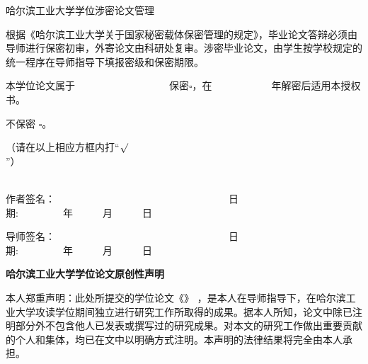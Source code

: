 {} %

\begin{center}{\subchapterstyle 哈尔滨工业大学\cxuewei 学位涉密论文管理}\end{center}

    根据《哈尔滨工业大学关于国家秘密载体保密管理的规定》，毕业论文答辩必须由导师进行保密初审，外寄论文由科研处复审。涉密毕业论文，由学生按学校规定的统一程序在导师指导下填报密级和保密期限。

\begin{flushright}

本学位论文属于~~~~~~~~~~~~~~~~~~~保密$\square$，在~~~~~~~~~~~~年解密后适用本授权书。~~~~~

不保密
$\square$。~~~~~~~~~~~~~~~~~~~~~~~~~~~~~~~~~~~~~~~~~~~~~~~~~~~~~~~~~~~~~~

（请在以上相应方框内打“$\surd$”）~~~~~~~~~~~~~~~~~~~~~~~~~~~~~~~~~~~~~~~~~~~~~~~~~~~~~~~~~~~~~~~~~~~~~~~

\end{flushright}
\begin{flushright}

作者签名：~~~~~~~~~~~~~~~~~~~~~~~~~~~~~~~~~~~日期:~~~~~~~~~年~~~~~~月~~~~~~日~~~~

导师签名：~~~~~~~~~~~~~~~~~~~~~~~~~~~~~~~~~~~日期:~~~~~~~~~年~~~~~~月~~~~~~日~~~~

\end{flushright}
 \fi

\newpage
{}

\vspace*{0cm}
\newcommand{\subchapterstyle}%
  {\CJKfamily{hei}\rmfamily\bfseries\fontsize{16bp}{16bp}\selectfont}

{}
\begin{center}{\subchapterstyle 哈尔滨工业大学\cxuewei 学位论文原创性声明}\end{center}

    本人郑重声明：此处所提交的\cxuewei 学位论文《\chinesethesistitle》 ，是本人在导师指导下，在哈尔滨工业大学攻读\cxuewei 学位期间独立进行研究工作所取得的成果。据本人所知，论文中除已注明部分外不包含他人已发表或撰写过的研究成果。对本文的研究工作做出重要贡献的个人和集体，均已在文中以明确方式注明。本声明的法律结果将完全由本人承担。


